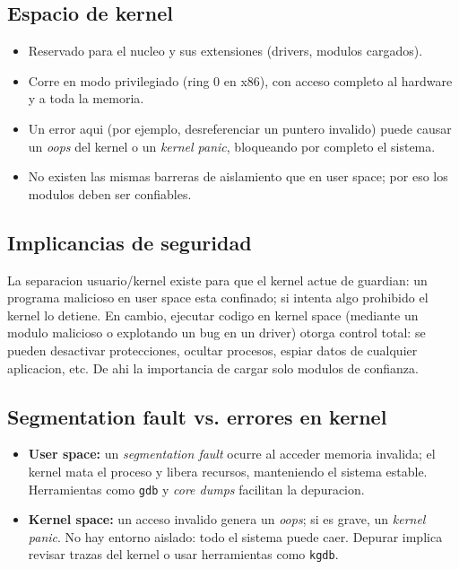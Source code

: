 \subsection*{Espacio de kernel}

\begin{itemize}
  \item Reservado para el nucleo y sus extensiones (drivers, modulos cargados).
  \item Corre en modo privilegiado (ring 0 en x86), con acceso completo al hardware y a toda la memoria.
  \item Un error aqui (por ejemplo, desreferenciar un puntero invalido) puede causar un \textit{oops} del kernel o un \textit{kernel panic}, bloqueando por completo el sistema.
  \item No existen las mismas barreras de aislamiento que en user space; por eso los modulos deben ser confiables.
\end{itemize}

\subsection*{Implicancias de seguridad}

La separacion usuario/kernel existe para que el kernel actue de guardian: un programa malicioso en user space esta confinado; si intenta algo prohibido el kernel lo detiene. En cambio, ejecutar codigo en kernel space (mediante un modulo malicioso o explotando un bug en un driver) otorga control total: se pueden desactivar protecciones, ocultar procesos, espiar datos de cualquier aplicacion, etc. De ahi la importancia de cargar solo modulos de confianza.

\subsection*{Segmentation fault vs. errores en kernel}

\begin{itemize}
  \item \textbf{User space:} un \textit{segmentation fault} ocurre al acceder memoria invalida; el kernel mata el proceso y libera recursos, manteniendo el sistema estable. Herramientas como \texttt{gdb} y \emph{core dumps} facilitan la depuracion.
  \item \textbf{Kernel space:} un acceso invalido genera un \textit{oops}; si es grave, un \textit{kernel panic}. No hay entorno aislado: todo el sistema puede caer. Depurar implica revisar trazas del kernel o usar herramientas como \texttt{kgdb}.
\end{itemize}

